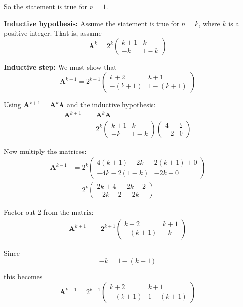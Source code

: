 \documentclass[leqno]{article}
\begin{document}
\begin{enumerate}[
  label=\textbf{\arabic*.},
  leftmargin=*,
  topsep=0pt,
  partopsep=0pt,
  parsep=0pt
]
\begin{djsSolution}
\begin{enumerate}[label=\textbf{(\alph*)}]
So the statement is true for $n=1$.

\textbf{Inductive hypothesis:} Assume the statement is true for $n=k$, where $k$ is a positive integer. That is, assume
\[
\mathbf{A}^k=2^k\begin{pmatrix}k+1&k\\-k&1-k\end{pmatrix}
\]

\textbf{Inductive step:} We must show that
\[
\mathbf{A}^{k+1}=2^{k+1}\begin{pmatrix}k+2&k+1\\-(k+1)&1-(k+1)\end{pmatrix}
\]

Using $\mathbf{A}^{k+1}=\mathbf{A}^k\mathbf{A}$ and the inductive hypothesis:
\begin{align*}
\mathbf{A}^{k+1} &= \mathbf{A}^k\mathbf{A} \\
&= 2^k\begin{pmatrix}k+1&k\\-k&1-k\end{pmatrix}
\begin{pmatrix}4&2\\-2&0\end{pmatrix}
\end{align*}

Now multiply the matrices:
\begin{align*}
\mathbf{A}^{k+1}
&=2^k\begin{pmatrix}
4(k+1)-2k & 2(k+1)+0 \\
-4k-2(1-k) & -2k+0
\end{pmatrix} \\
&=2^k\begin{pmatrix}
2k+4 & 2k+2 \\
-2k-2 & -2k
\end{pmatrix}
\end{align*}

Factor out $2$ from the matrix:
\begin{align*}
\mathbf{A}^{k+1}
&=2^{k+1}\begin{pmatrix}
k+2 & k+1 \\
-(k+1) & -k
\end{pmatrix}
\end{align*}

Since
\[
-k = 1-(k+1)
\]

this becomes
\[
\mathbf{A}^{k+1}=2^{k+1}\begin{pmatrix}k+2&k+1\\-(k+1)&1-(k+1)\end{pmatrix}
\]


\end{enumerate}
\end{djsSolution}
\end{enumerate}
\end{document}
